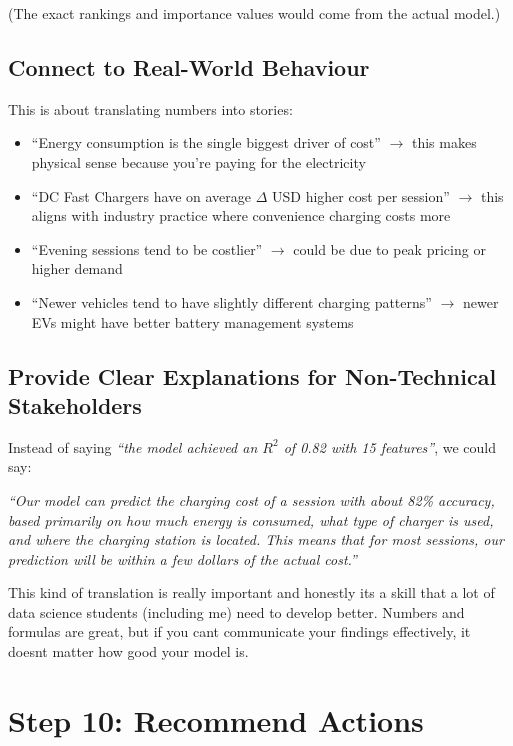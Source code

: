 \documentclass[12pt, a4paper]{article}
\begin{document}
(The exact rankings and importance values would come from the actual model.)

\subsection{Connect to Real-World Behaviour}

This is about translating numbers into stories:
\begin{itemize}
    \item ``Energy consumption is the single biggest driver of cost'' $\rightarrow$ this makes physical sense because you're paying for the electricity
    \item ``DC Fast Chargers have on average $\Delta$ USD higher cost per session'' $\rightarrow$ this aligns with industry practice where convenience charging costs more
    \item ``Evening sessions tend to be costlier'' $\rightarrow$ could be due to peak pricing or higher demand
    \item ``Newer vehicles tend to have slightly different charging patterns'' $\rightarrow$ newer EVs might have better battery management systems
\end{itemize}

\subsection{Provide Clear Explanations for Non-Technical Stakeholders}

Instead of saying \textit{``the model achieved an $R^2$ of 0.82 with 15 features''}, we could say:

\textit{``Our model can predict the charging cost of a session with about 82\% accuracy, based primarily on how much energy is consumed, what type of charger is used, and where the charging station is located. This means that for most sessions, our prediction will be within a few dollars of the actual cost.''}

This kind of translation is really important and honestly its a skill that a lot of data science students (including me) need to develop better. Numbers and formulas are great, but if you cant communicate your findings effectively, it doesnt matter how good your model is.

\newpage

\section{Step 10: Recommend Actions}
\end{document}

